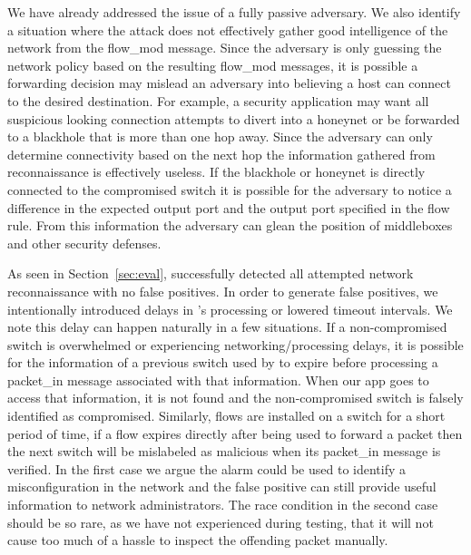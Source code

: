  We have already
addressed the issue of a fully passive adversary. We also identify a 
situation where the attack does not effectively gather good 
intelligence of the network from the flow\_mod message. Since the 
adversary is only guessing the network policy based on the resulting 
flow\_mod messages, it is possible a forwarding decision may mislead an
adversary into believing a host can connect to the desired destination. 
For example, a security application may want all suspicious looking
connection attempts to divert into a honeynet or be forwarded to a 
blackhole that is more than one hop away. Since the adversary can only
determine connectivity based on the next hop the information gathered
from reconnaissance is effectively useless. If the blackhole or honeynet
is directly connected to the compromised switch it is possible for the
adversary to notice a difference in the expected output port and the
output port specified in the flow rule. From this information the
adversary can glean the position of middleboxes and other security
defenses.

 As seen in Section~\ref{sec:eval}, \name
successfully detected all attempted network reconnaissance with no false
positives. In order to generate false positives, we intentionally
introduced delays in \name's processing or lowered timeout intervals. We 
note this delay can happen naturally in a few situations. If a 
non-compromised switch is overwhelmed or experiencing 
networking/processing delays, it is possible for the information of a 
previous switch used by \name to expire before processing a packet\_in 
message associated with that information. When our app goes to access 
that information, it is not found and the non-compromised switch is 
falsely identified as compromised. Similarly, flows are installed on a 
switch for a short period of time, if a flow expires directly after 
being used to forward a packet then the next switch will be mislabeled
as malicious when its packet\_in message is verified. In the first 
case we argue the alarm could be used to identify a misconfiguration
in the network and the false positive can still provide useful 
information to network administrators. The race condition in the 
second case should be so rare, as we have not experienced during 
testing, that it will not cause too much of a hassle to inspect the 
offending packet manually.

